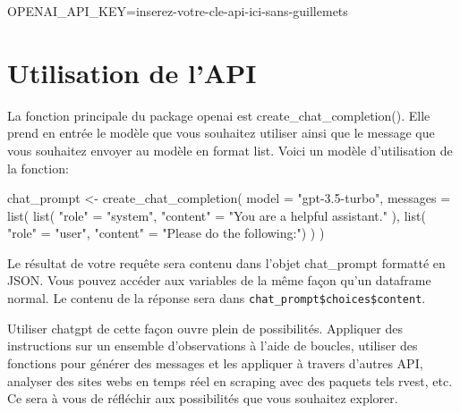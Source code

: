 \documentclass[
  letterpaper,
  DIV=11,
  numbers=noendperiod]{scrreprt}
\newenvironment{Shaded}{\begin{snugshade}}{\end{snugshade}}
\newcommand{\AttributeTok}[1]{\textcolor[rgb]{0.40,0.45,0.13}{#1}}
\newcommand{\FunctionTok}[1]{\textcolor[rgb]{0.28,0.35,0.67}{#1}}
\newcommand{\NormalTok}[1]{\textcolor[rgb]{0.00,0.23,0.31}{#1}}
\newcommand{\OtherTok}[1]{\textcolor[rgb]{0.00,0.23,0.31}{#1}}
\newcommand{\SpecialCharTok}[1]{\textcolor[rgb]{0.37,0.37,0.37}{#1}}
\newcommand{\StringTok}[1]{\textcolor[rgb]{0.13,0.47,0.30}{#1}}
\begin{document}
\begin{Shaded}
\begin{Highlighting}[]
\NormalTok{OPENAI\_API\_KEY}\OtherTok{=}\NormalTok{inserez}\SpecialCharTok{{-}}\NormalTok{votre}\SpecialCharTok{{-}}\NormalTok{cle}\SpecialCharTok{{-}}\NormalTok{api}\SpecialCharTok{{-}}\NormalTok{ici}\SpecialCharTok{{-}}\NormalTok{sans}\SpecialCharTok{{-}}\NormalTok{guillemets}
\end{Highlighting}
\end{Shaded}

\hypertarget{utilisation-de-lapi}{%
\section{Utilisation de l'API}\label{utilisation-de-lapi}}

La fonction principale du package openai est create\_chat\_completion().
Elle prend en entrée le modèle que vous souhaitez utiliser ainsi que le
message que vous souhaitez envoyer au modèle en format list. Voici un
modèle d'utilisation de la fonction:

\begin{Shaded}
\begin{Highlighting}[]
\NormalTok{chat\_prompt }\OtherTok{\textless{}{-}} \FunctionTok{create\_chat\_completion}\NormalTok{(}
    \AttributeTok{model =} \StringTok{"gpt{-}3.5{-}turbo"}\NormalTok{,}
    \AttributeTok{messages =} \FunctionTok{list}\NormalTok{(}
        \FunctionTok{list}\NormalTok{(}
            \StringTok{"role"} \OtherTok{=} \StringTok{"system"}\NormalTok{,}
            \StringTok{"content"} \OtherTok{=} \StringTok{"You are a helpful assistant."}
\NormalTok{        ),}
        \FunctionTok{list}\NormalTok{(}
            \StringTok{"role"} \OtherTok{=} \StringTok{"user"}\NormalTok{,}
            \StringTok{"content"} \OtherTok{=} \StringTok{"Please do the following:"}\NormalTok{)}
\NormalTok{        )}
\NormalTok{    )}
\end{Highlighting}
\end{Shaded}

Le résultat de votre requête sera contenu dans l'objet chat\_prompt
formatté en JSON. Vous pouvez accéder aux variables de la même façon
qu'un dataframe normal. Le contenu de la réponse sera dans
\texttt{chat\_prompt\$choices\$content}.

Utiliser chatgpt de cette façon ouvre plein de possibilités. Appliquer
des instructions sur un ensemble d'observations à l'aide de boucles,
utiliser des fonctions pour générer des messages et les appliquer à
travers d'autres API, analyser des sites webs en temps réel en scraping
avec des paquets tels rvest, etc. Ce sera à vous de réfléchir aux
possibilités que vous souhaitez explorer.
\end{document}
